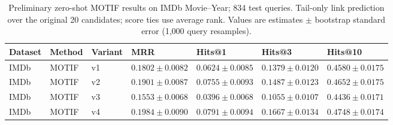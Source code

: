 \begin{table}[htbp]
\centering
\small
\renewcommand{\arraystretch}{1.15}
\setlength{\tabcolsep}{5pt}
\begin{adjustbox}{max width=\linewidth}
\begin{tabular}{|l|l|l|l|l|l|l|}
\hline
\textbf{Dataset} & \textbf{Method} & \textbf{Variant} & \textbf{MRR} & \textbf{Hits@1} & \textbf{Hits@3} & \textbf{Hits@10} \\
\hline
IMDb & MOTIF & v1 & $0.1802 \pm 0.0082$ & $0.0624 \pm 0.0085$ & $0.1379 \pm 0.0120$ & $0.4580 \pm 0.0175$ \\
\hline
IMDb & MOTIF & v2 & $0.1901 \pm 0.0087$ & $0.0755 \pm 0.0093$ & $0.1487 \pm 0.0123$ & $0.4652 \pm 0.0175$ \\
\hline
IMDb & MOTIF & v3 & $0.1553 \pm 0.0068$ & $0.0396 \pm 0.0068$ & $0.1055 \pm 0.0107$ & $0.4436 \pm 0.0171$ \\
\hline
IMDb & MOTIF & v4 & $0.1984 \pm 0.0090$ & $0.0791 \pm 0.0094$ & $0.1667 \pm 0.0134$ & $0.4748 \pm 0.0174$ \\
\hline
\end{tabular}
\end{adjustbox}
\caption{Preliminary zero-shot MOTIF results on IMDb Movie--Year; 834 test queries. Tail-only link prediction over the original 20 candidates; score ties use average rank. Values are estimates $\pm$ bootstrap standard error (1,000 query resamples).}
\label{tab:motif-imdb-movie-year-link_prediction}
\end{table}

